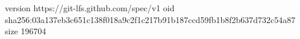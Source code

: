 version https://git-lfs.github.com/spec/v1
oid sha256:03a137eb3c651c138f018a9c2f1c217b91b187ccd59fb1b8f2b637d732c54a87
size 196704
